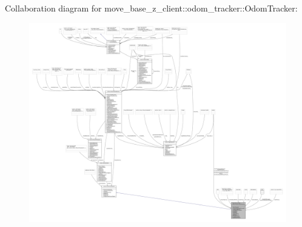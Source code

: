 Collaboration diagram for move\+\_\+base\+\_\+z\+\_\+client\+:\+:odom\+\_\+tracker\+:\+:Odom\+Tracker\+:
\nopagebreak
\begin{figure}[H]
\begin{center}
\leavevmode
\includegraphics[width=350pt]{classmove__base__z__client_1_1odom__tracker_1_1OdomTracker__coll__graph}
\end{center}
\end{figure}
